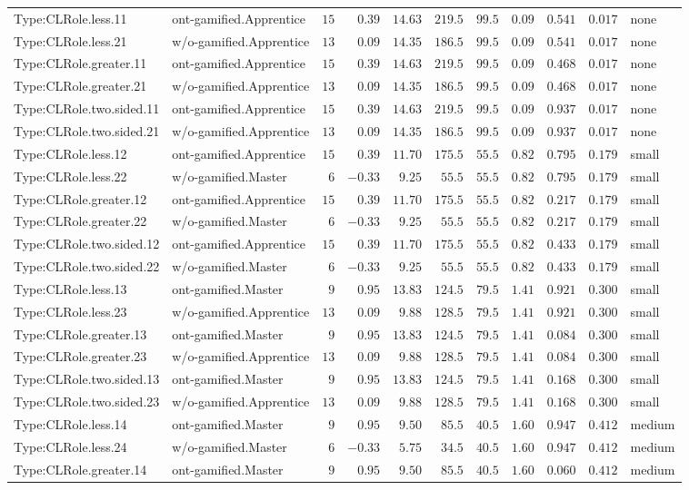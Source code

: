 \documentclass[6pt,a4paper]{article}
\begin{document}
{\begin{longtable}{llrrrrrrrrl}
Type:CLRole.less.11&ont-gamified.Apprentice&$15$&$ 0.39$&$14.63$&$219.5$&$ 99.5$&$ 0.09$&$0.541$&$0.017$&none\tabularnewline
Type:CLRole.less.21&w/o-gamified.Apprentice&$13$&$ 0.09$&$14.35$&$186.5$&$ 99.5$&$ 0.09$&$0.541$&$0.017$&none\tabularnewline
Type:CLRole.greater.11&ont-gamified.Apprentice&$15$&$ 0.39$&$14.63$&$219.5$&$ 99.5$&$ 0.09$&$0.468$&$0.017$&none\tabularnewline
Type:CLRole.greater.21&w/o-gamified.Apprentice&$13$&$ 0.09$&$14.35$&$186.5$&$ 99.5$&$ 0.09$&$0.468$&$0.017$&none\tabularnewline
Type:CLRole.two.sided.11&ont-gamified.Apprentice&$15$&$ 0.39$&$14.63$&$219.5$&$ 99.5$&$ 0.09$&$0.937$&$0.017$&none\tabularnewline
Type:CLRole.two.sided.21&w/o-gamified.Apprentice&$13$&$ 0.09$&$14.35$&$186.5$&$ 99.5$&$ 0.09$&$0.937$&$0.017$&none\tabularnewline
Type:CLRole.less.12&ont-gamified.Apprentice&$15$&$ 0.39$&$11.70$&$175.5$&$ 55.5$&$ 0.82$&$0.795$&$0.179$&small\tabularnewline
Type:CLRole.less.22&w/o-gamified.Master&$ 6$&$-0.33$&$ 9.25$&$ 55.5$&$ 55.5$&$ 0.82$&$0.795$&$0.179$&small\tabularnewline
Type:CLRole.greater.12&ont-gamified.Apprentice&$15$&$ 0.39$&$11.70$&$175.5$&$ 55.5$&$ 0.82$&$0.217$&$0.179$&small\tabularnewline
Type:CLRole.greater.22&w/o-gamified.Master&$ 6$&$-0.33$&$ 9.25$&$ 55.5$&$ 55.5$&$ 0.82$&$0.217$&$0.179$&small\tabularnewline
Type:CLRole.two.sided.12&ont-gamified.Apprentice&$15$&$ 0.39$&$11.70$&$175.5$&$ 55.5$&$ 0.82$&$0.433$&$0.179$&small\tabularnewline
Type:CLRole.two.sided.22&w/o-gamified.Master&$ 6$&$-0.33$&$ 9.25$&$ 55.5$&$ 55.5$&$ 0.82$&$0.433$&$0.179$&small\tabularnewline
Type:CLRole.less.13&ont-gamified.Master&$ 9$&$ 0.95$&$13.83$&$124.5$&$ 79.5$&$ 1.41$&$0.921$&$0.300$&small\tabularnewline
Type:CLRole.less.23&w/o-gamified.Apprentice&$13$&$ 0.09$&$ 9.88$&$128.5$&$ 79.5$&$ 1.41$&$0.921$&$0.300$&small\tabularnewline
Type:CLRole.greater.13&ont-gamified.Master&$ 9$&$ 0.95$&$13.83$&$124.5$&$ 79.5$&$ 1.41$&$0.084$&$0.300$&small\tabularnewline
Type:CLRole.greater.23&w/o-gamified.Apprentice&$13$&$ 0.09$&$ 9.88$&$128.5$&$ 79.5$&$ 1.41$&$0.084$&$0.300$&small\tabularnewline
Type:CLRole.two.sided.13&ont-gamified.Master&$ 9$&$ 0.95$&$13.83$&$124.5$&$ 79.5$&$ 1.41$&$0.168$&$0.300$&small\tabularnewline
Type:CLRole.two.sided.23&w/o-gamified.Apprentice&$13$&$ 0.09$&$ 9.88$&$128.5$&$ 79.5$&$ 1.41$&$0.168$&$0.300$&small\tabularnewline
Type:CLRole.less.14&ont-gamified.Master&$ 9$&$ 0.95$&$ 9.50$&$ 85.5$&$ 40.5$&$ 1.60$&$0.947$&$0.412$&medium\tabularnewline
Type:CLRole.less.24&w/o-gamified.Master&$ 6$&$-0.33$&$ 5.75$&$ 34.5$&$ 40.5$&$ 1.60$&$0.947$&$0.412$&medium\tabularnewline
Type:CLRole.greater.14&ont-gamified.Master&$ 9$&$ 0.95$&$ 9.50$&$ 85.5$&$ 40.5$&$ 1.60$&$0.060$&$0.412$&medium\tabularnewline

\end{longtable}}
\end{document}
